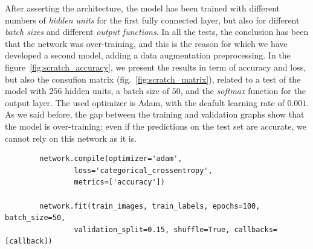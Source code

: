 \documentclass[11pt,a4paper,oneside]{article}
\begin{document}
After asserting the architecture, the model has been trained with different numbers of \textit{hidden units} for the first fully connected layer, but also for different \textit{batch sizes} and different \textit{output functions}. 
In all the tests, the conclusion has been that the network was over-training, and this is the reason for which we have developed a second model, adding a data augmentation preprocessing. 
In the figure~\ref{fig:scratch_accuracy}, we present the results in term of accuracy and loss, but also the consufion matrix (fig.~\ref{fig:scratch_matrix}), related to a test of the model with $256$ hidden units, a batch size of $50$, and the \textit{softmax} function for the output layer. 
The used optimizer is Adam, with the deafult learning rate of $0.001$. As we said before, the gap between the training and validation graphs show that the model is over-training: even if the predictions on the test set are accurate, we cannot rely on this network as it is.
\begin{verbatim}
        network.compile(optimizer='adam',
                loss='categorical_crossentropy',
                metrics=['accuracy'])

        network.fit(train_images, train_labels, epochs=100, batch_size=50, 
                validation_split=0.15, shuffle=True, callbacks=[callback])
\end{verbatim}
\end{document}
